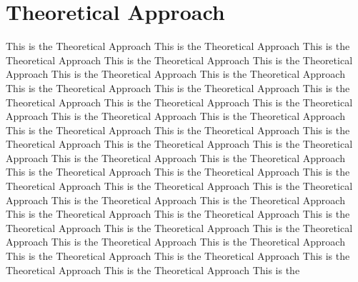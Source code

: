 \documentclass[twocolumn,a4paper,10pt,twoside]{article}
\begin{document}
\section{Theoretical Approach}
This is the Theoretical Approach This is the Theoretical Approach This is the Theoretical Approach This is the Theoretical Approach This is the Theoretical Approach This is the Theoretical Approach This is the Theoretical Approach This is the Theoretical Approach This is the Theoretical Approach This is the Theoretical Approach This is the Theoretical Approach This is the Theoretical Approach This is the Theoretical Approach This is the Theoretical Approach This is the Theoretical Approach This is the Theoretical Approach This is the Theoretical Approach This is the Theoretical Approach This is the Theoretical Approach This is the Theoretical Approach This is the Theoretical Approach This is the Theoretical Approach This is the Theoretical Approach This is the Theoretical Approach This is the Theoretical Approach This is the Theoretical Approach This is the Theoretical Approach This is the Theoretical Approach This is the Theoretical Approach This is the Theoretical Approach This is the Theoretical Approach This is the Theoretical Approach This is the Theoretical Approach This is the Theoretical Approach This is the Theoretical Approach This is the Theoretical Approach This is the Theoretical Approach This is the Theoretical Approach This is the Theoretical Approach This is the 
\end{document}
